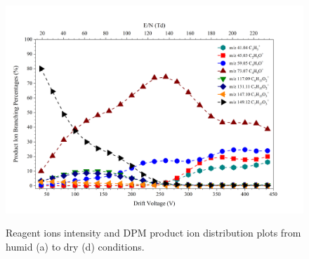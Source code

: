\begin{figure}
{\includegraphics[width=0.48\linewidth]{pics/DPM_dry_DC_lynx.png}}
\vfill
{}
\caption{Reagent ions intensity and DPM product ion distribution plots from  humid  (a) to dry (d) conditions.}
\label{fig:dpm}
\end{figure}

